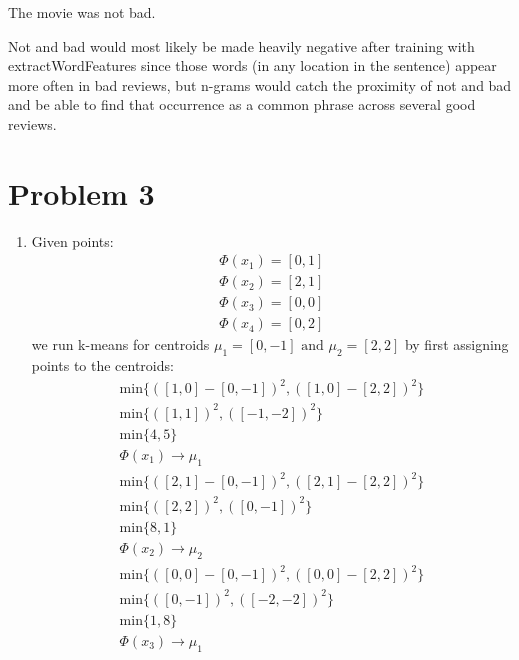 \documentclass[12pt]{article}
\begin{document}
\begin{enumerate}[label=(\alph*)]
			The movie was not bad.

			Not and bad would most likely be made heavily negative after training with
			extractWordFeatures since those words (in any location in the sentence)
			appear more often in bad reviews, but n-grams would catch the proximity
			of not and bad and be able to find that occurrence as a common phrase across
			several good reviews.

	\end{enumerate}

	\section*{Problem 3}

	\begin{enumerate}[label=(\alph*)]
		\item Given points:
			\begin{gather*}
				\Phi(x_1) = [0, 1] \\
				\Phi(x_2) = [2, 1] \\
				\Phi(x_3) = [0, 0] \\
				\Phi(x_4) = [0, 2]
			\end{gather*}
			we run k-means for centroids
			\(\mu_1 = [0, -1] \text{ and } \mu_2 = [2, 2]\)
			by first assigning points to the centroids:
			\begin{gather*}
				\text{min} \{ ( [1,0] - [0, -1] )^2, ( [1,0] - [2, 2] )^2\} \\
				\text{min} \{ ( [1,1] )^2, ( [-1, -2] )^2\} \\
				\text{min} \{ 4, 5\} \\
				\Phi(x_1) \rightarrow \mu_1
			\end{gather*}
			\begin{gather*}
				\text{min} \{ ( [2,1] - [0, -1] )^2, ( [2,1] - [2, 2] )^2\} \\
				\text{min} \{ ( [2,2] )^2, ( [0, -1] )^2\} \\
				\text{min} \{ 8, 1\} \\
				\Phi(x_2) \rightarrow \mu_2
			\end{gather*}
			\begin{gather*}
				\text{min} \{ ( [0,0] - [0, -1] )^2, ( [0,0] - [2, 2] )^2\} \\
				\text{min} \{ ( [0,-1] )^2, ( [-2, -2] )^2\} \\
				\text{min} \{ 1, 8\} \\
				\Phi(x_3) \rightarrow \mu_1
			\end{gather*}

\end{enumerate}
\end{document}
